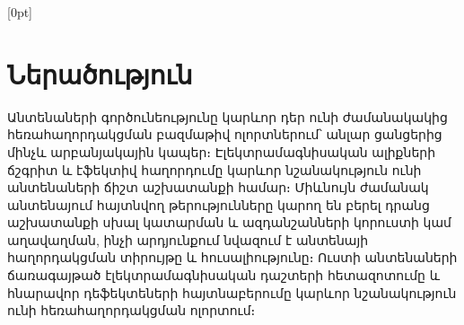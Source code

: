 \documentclass[12pt, fleqn]{report}
\begin{document}
\emergencystretch 3cm

    \thispagestyle{empty}
    \begin{center}
    \end{center}

\newpage

  [0pt]
  {\addvspace{10pt}\bfseries}
  { \hspace{0.0em}}
  {}
  {\hfill\contentspage}
  
\renewcommand{\contentsname}{Բովանդակություն}

\tableofcontents

\newpage

\captionsetup[figure]{name=Նկ․}
\captionsetup{justification=raggedright, width=1.0\textwidth, font=small, format=hang}

\section* {Ներածություն}

Անտենաների գործունեությունը կարևոր դեր ունի ժամանակակից հեռահաղորդակցման բազմաթիվ ոլորտներում՝ անլար ցանցերից մինչև արբանյակային կապեր։ Էլեկտրամագնիսական ալիքների ճշգրիտ և էֆեկտիվ հաղորդումը կարևոր նշանակություն ունի անտենաների ճիշտ աշխատանքի համար։ Միևնույն ժամանակ անտենայում հայտնվող թերությունները կարող են բերել դրանց աշխատանքի սխալ կատարման և ազդանշանների կորուստի կամ աղավաղման, ինչի արդյունքում նվազում է անտենայի հաղորդակցման տիրույթը և հուսալիությունը։ Ուստի անտենաների ճառագայթած էլեկտրամագնիսական դաշտերի հետազոտումը և հնարավոր դեֆեկտեների հայտնաբերումը կարևոր նշանակություն ունի հեռահաղորդակցման ոլորտում։
\end{document}
